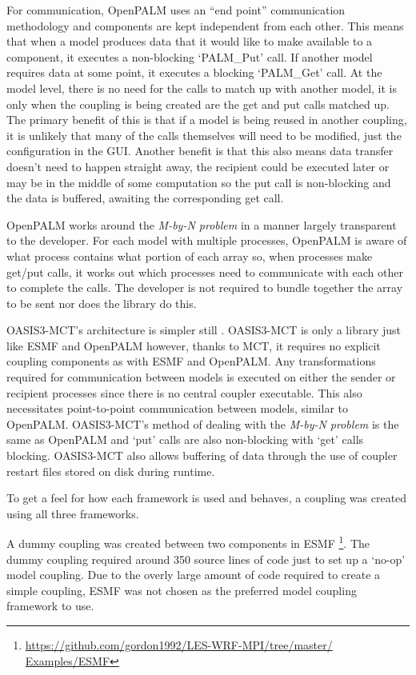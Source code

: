 \documentclass{acm_proc_article-sp}
\begin{document}
For communication, OpenPALM uses an ``end point'' communication methodology
\cite{CERFACS2007} and components are kept independent from each other. This
means that when a model produces data that it would like to make available to a
component, it executes a non-blocking `PALM\_Put' call. If another model
requires data at some point, it executes a blocking `PALM\_Get' call. At the
model level, there is no need for the calls to match up with another model, it
is only when the coupling is being created are the get and put calls matched up.
The primary benefit of this is that if a model is being reused in another
coupling, it is unlikely that many of the calls themselves will need to be
modified, just the configuration in the GUI. Another benefit is that this also
means data transfer doesn't need to happen straight away, the recipient could be
executed later or may be in the middle of some computation so the put call is
non-blocking and the data is buffered, awaiting the corresponding get call.

OpenPALM works around the \textit{M-by-N problem} in a manner largely
transparent to the developer. For each model with multiple processes, OpenPALM
is aware of what process contains what portion of each array so, when processes
make get/put calls, it works out which processes need to communicate with each
other to complete the calls. The developer is not required to bundle together
the array to be sent nor does the library do this.

OASIS3-MCT's architecture is simpler still \cite{OASIS3-MCT2013}. OASIS3-MCT is
only a library just like ESMF and OpenPALM however, thanks to MCT, it requires
no explicit coupling components as with ESMF and OpenPALM. Any transformations
required for communication between models is executed on either the sender or
recipient processes since there is no central coupler executable. This also
necessitates point-to-point communication between models, similar to OpenPALM.
OASIS3-MCT's method of dealing with the \textit{M-by-N problem} is the same as
OpenPALM and `put' calls are also non-blocking with `get' calls blocking.
OASIS3-MCT also allows buffering of data through the use of coupler restart
files stored on disk during runtime.

To get a feel for how each framework is used and behaves, a coupling was created
using all three frameworks.

A dummy coupling was created between two components in ESMF
\footnote{\url{https://github.com/gordon1992/LES-WRF-MPI/tree/master/
Examples/ESMF}}. The dummy coupling required around 350 source lines of code
just to set up a `no-op' model coupling. Due to the overly large amount of code
required to create a simple coupling, ESMF was not chosen as the preferred model
coupling framework to use.
\end{document}
